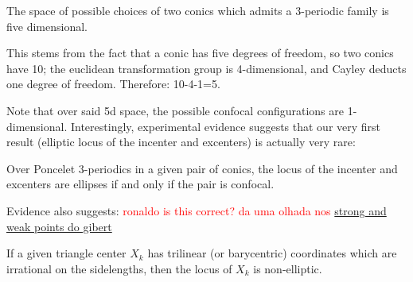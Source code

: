 \begin{remark}
The space of possible choices of two conics which admits a 3-periodic family is five dimensional.
\end{remark}

This stems from the fact that a conic has five degrees of freedom, so two conics have 10; the euclidean transformation group is 4-dimensional, and Cayley deducts one degree of freedom. Therefore: 10-4-1=5.

Note that over said 5d space, the possible confocal configurations are 1-dimensional. Interestingly, experimental evidence suggests that our very first result (elliptic locus of the incenter and excenters) is actually very rare:

\begin{conjecture}
Over Poncelet 3-periodics in a given pair of conics, the locus of the incenter and excenters are ellipses if and only if the pair is confocal.
\label{conj:07-incenter-excenter-loci}
\end{conjecture}

Evidence also suggests:
\textcolor{red}{ronaldo is this correct? da uma olhada nos \href{https://bernard-gibert.pagesperso-orange.fr/Tables/table28.html}{strong and weak points do gibert}}

\begin{conjecture}
If a given triangle center $X_k$ has trilinear (or barycentric) coordinates which are irrational on the sidelengths, then the locus of $X_k$ is non-elliptic.
\end{conjecture}
